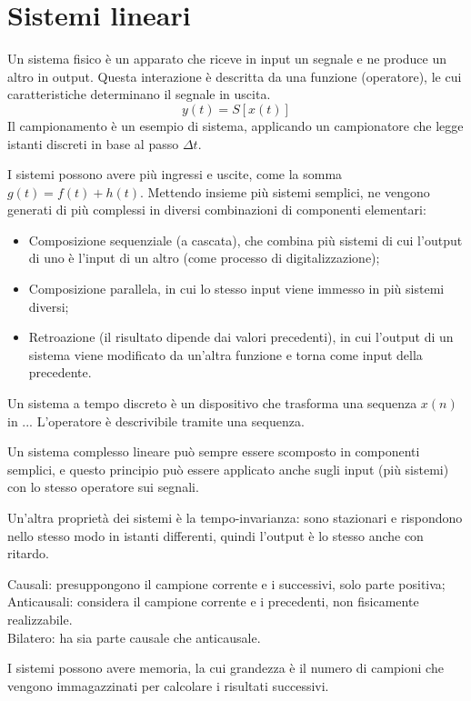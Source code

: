 \section{Sistemi lineari}
Un sistema fisico è un apparato che riceve in input un segnale e ne produce un altro in output. Questa interazione è descritta da una funzione (operatore), le cui caratteristiche determinano il segnale in uscita. 
$$y(t) = S[x(t)]$$
Il campionamento è un esempio di sistema, applicando un campionatore che legge istanti discreti in base al passo $\Delta t$. 

I sistemi possono avere più ingressi e uscite, come la somma $g(t) = f(t) + h(t)$. Mettendo insieme più sistemi semplici, ne vengono generati di più complessi in diversi combinazioni di componenti elementari:
\begin{itemize}
	\item Composizione sequenziale (a cascata), che combina più sistemi di cui l'output di uno è l'input di un altro (come processo di digitalizzazione);
	\item Composizione parallela, in cui lo stesso input viene immesso in più sistemi diversi;
	\item Retroazione (il risultato dipende dai valori precedenti), in cui l'output di un sistema viene modificato da un'altra funzione e torna come input della precedente.
\end{itemize}

Un sistema a tempo discreto è un dispositivo che trasforma una sequenza $x(n)$ in ...
L'operatore è descrivibile tramite una sequenza.

Un sistema complesso lineare può sempre essere scomposto in componenti semplici, e questo principio può essere applicato anche sugli input (più sistemi) con lo stesso operatore sui segnali.

Un'altra proprietà dei sistemi è la tempo-invarianza: sono stazionari e rispondono nello stesso modo in istanti differenti, quindi l'output è lo stesso anche con ritardo. 

Causali: presuppongono il campione corrente e i successivi, solo parte positiva; \\
Anticausali: considera il campione corrente e i precedenti, non fisicamente realizzabile. \\
Bilatero: ha sia parte causale che anticausale.

I sistemi possono avere memoria, la cui grandezza è il numero di campioni che vengono immagazzinati per calcolare i risultati successivi. 

